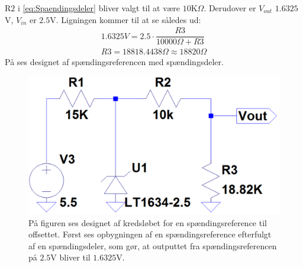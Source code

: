 R$2$ i \eqref{eq:Spaendingsdeler} bliver valgt til at være $10$K$\Omega$. Derudover er $V_{out}$ $1.6325$V, $V_{in}$ er $2.5$V. Ligningen kommer til at se således ud: 
\begin{eqnarray}
1.6325V = 2.5 \cdot \dfrac{R3}{10000\Omega + R3} \\
R3 = 18818.4438\Omega \approx 18820\Omega
\end{eqnarray}
\noindent På  ses designet af spændingsreferencen med spændingsdeler. 
\begin{figure}[H]
	\centering
	\includegraphics[scale=.5]{figures/cProblemloesning/OffsetSpaendingsRef2.PNG}
	\caption{På figuren ses designet af kredsløbet for en spændingsreference til offsettet. Først ses opbygningen af en spændingsreference efterfulgt af en spændingsdeler, som gør, at outputtet fra spændingsreferencen på $2.5$V bliver til $1.6325$V.}
	\label{fig:Spaendingsreference_offset}
\end{figure}

